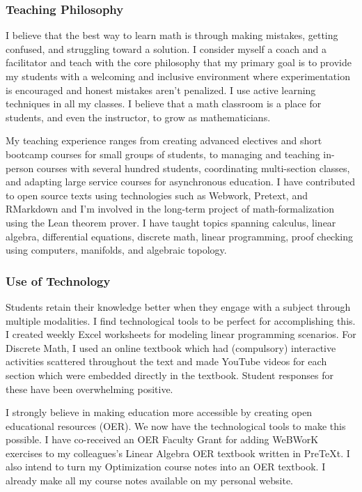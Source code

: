 \documentclass[
]{report}
\begin{document}
\hypertarget{teaching-philosophy}{%
\subsubsection*{Teaching Philosophy}\label{teaching-philosophy}}


I believe that the best way to learn math is through making mistakes, getting confused, and struggling toward a solution. I consider myself a coach and a facilitator and teach with the core philosophy that my primary goal is to provide my students with a welcoming and inclusive environment where experimentation is encouraged and honest mistakes aren't penalized.
I use active learning techniques in all my classes.
I believe that a math classroom is a place for students, and even the instructor, to grow as mathematicians.

My teaching experience ranges from creating advanced electives and short bootcamp courses for small groups of students, to managing and teaching in-person courses with several hundred students, coordinating multi-section classes, and adapting large service courses for asynchronous education. I have contributed to open source texts using technologies such as Webwork, Pretext, and RMarkdown and I'm involved in the long-term project of math-formalization using the Lean theorem prover. I have taught topics spanning calculus, linear algebra, differential equations, discrete math, linear programming, proof checking using computers, manifolds, and algebraic topology.

\hypertarget{use-of-technology}{%
\subsubsection*{Use of Technology}\label{use-of-technology}}


Students retain their knowledge better when they engage with a subject through multiple modalities. I find technological tools to be perfect for accomplishing this. I created weekly Excel worksheets for modeling linear programming scenarios. For Discrete Math, I used an online textbook which had (compulsory) interactive activities scattered throughout the text and made YouTube videos for each section which were embedded directly in the textbook.
Student responses for these have been overwhelming positive.

I strongly believe in making education more accessible by creating open educational resources (OER). We now have the technological tools to make this possible.
I have co-received an OER Faculty Grant for adding WeBWorK exercises to my colleagues's Linear Algebra OER textbook written in PreTeXt. I also intend to turn my Optimization course notes into an OER textbook. I already make all my course notes available on my personal website.
\end{document}
